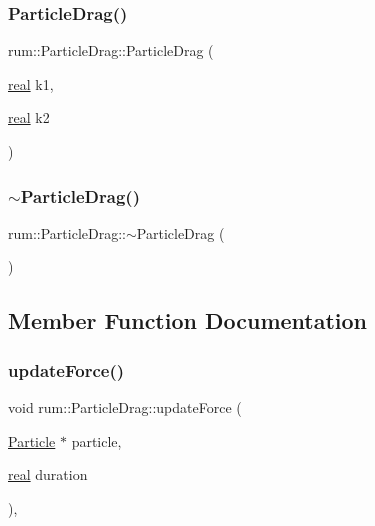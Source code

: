 \subsubsection{\texorpdfstring{Particle\+Drag()}{ParticleDrag()}}
{\footnotesize\ttfamily rum\+::\+Particle\+Drag\+::\+Particle\+Drag (\begin{DoxyParamCaption}\item[{\mbox{\hyperlink{namespacerum_a7e8cca23573d5eaead0f138cbaa4862c}{real}}}]{k1,  }\item[{\mbox{\hyperlink{namespacerum_a7e8cca23573d5eaead0f138cbaa4862c}{real}}}]{k2 }\end{DoxyParamCaption})}

\mbox{\label{classrum_1_1_particle_drag_a21072ca38b82529540f361a24cbec508}} 
\subsubsection{\texorpdfstring{$\sim$\+Particle\+Drag()}{~ParticleDrag()}}
{\footnotesize\ttfamily rum\+::\+Particle\+Drag\+::$\sim$\+Particle\+Drag (\begin{DoxyParamCaption}{ }\end{DoxyParamCaption})}



\subsection{Member Function Documentation}
\mbox{\label{classrum_1_1_particle_drag_a61c989e4a66ae25372c5983178067525}} 
\subsubsection{\texorpdfstring{update\+Force()}{updateForce()}}
{\footnotesize\ttfamily void rum\+::\+Particle\+Drag\+::update\+Force (\begin{DoxyParamCaption}\item[{\mbox{\hyperlink{classrum_1_1_particle}{Particle}} $\ast$}]{particle,  }\item[{\mbox{\hyperlink{namespacerum_a7e8cca23573d5eaead0f138cbaa4862c}{real}}}]{duration }\end{DoxyParamCaption})\hspace{0.3cm}{\ttfamily [override]}, {\ttfamily [virtual]}}



